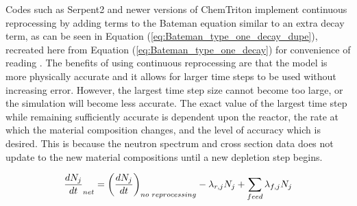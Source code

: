 Codes such as Serpent2 and newer versions of ChemTriton implement continuous reprocessing by adding terms to the Bateman equation similar to an extra decay term, as can be seen in Equation (\ref{eq:Bateman_type_one_decay_dupe}), recreated here from Equation (\ref{eq:Bateman_type_one_decay}) for convenience of reading \cite{aufiero_extended_2013, jr_vicente_valdez_modeling_2020}. The benefits of using continuous reprocessing are that the model is more physically accurate and it allows for larger time steps to be used without increasing error. However, the largest time step size cannot become too large, or the simulation will become less accurate.
The exact value of the largest time step while remaining sufficiently accurate is dependent upon the reactor, the rate at which the material composition changes, and the level of accuracy which is desired.
This is because the neutron spectrum and cross section data does not update to the new material compositions until a new depletion step begins.


\begin{equation} \hfill
\frac{dN_j}{dt}_{net} =\left( \frac{dN_j}{dt} \right)_{no\text{ }reprocessing} -  \lambda_{r, j} N_j + \sum_{feed} \lambda _{f, j} N_j
\hfill\label{eq:Bateman_type_one_decay_dupe} \end{equation}

